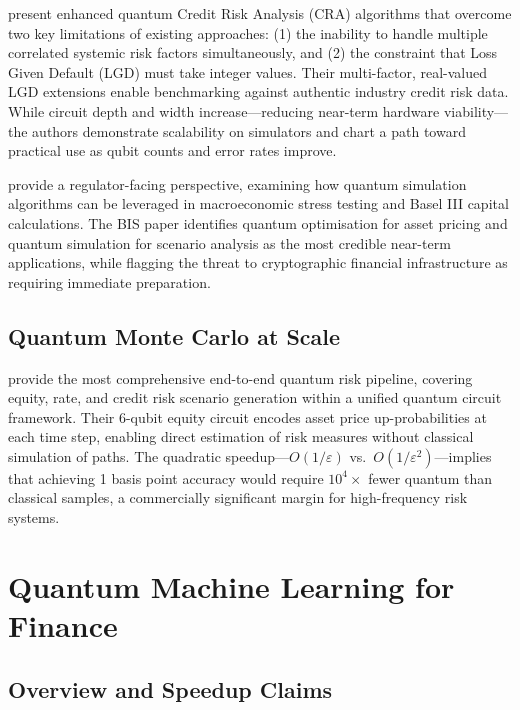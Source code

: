 \documentclass[12pt,a4paper]{article}
\begin{document}
\citet{dri_towards_2022} present enhanced quantum Credit Risk Analysis (CRA) algorithms that overcome two key limitations of existing approaches: (1) the inability to handle multiple correlated systemic risk factors simultaneously, and (2) the constraint that Loss Given Default (LGD) must take integer values. Their multi-factor, real-valued LGD extensions enable benchmarking against authentic industry credit risk data. While circuit depth and width increase---reducing near-term hardware viability---the authors demonstrate scalability on simulators and chart a path toward practical use as qubit counts and error rates improve.

\citet{auer_quantum_2024} provide a regulator-facing perspective, examining how quantum simulation algorithms can be leveraged in macroeconomic stress testing and Basel III capital calculations. The BIS paper identifies quantum optimisation for asset pricing and quantum simulation for scenario analysis as the most credible near-term applications, while flagging the threat to cryptographic financial infrastructure as requiring immediate preparation.

\subsection{Quantum Monte Carlo at Scale}

\citet{matsakos_quantum_2024} provide the most comprehensive end-to-end quantum risk pipeline, covering equity, rate, and credit risk scenario generation within a unified quantum circuit framework. Their 6-qubit equity circuit encodes asset price up-probabilities at each time step, enabling direct estimation of risk measures without classical simulation of paths. The quadratic speedup---$O(1/\varepsilon)$ vs.\ $O(1/\varepsilon^2)$---implies that achieving 1 basis point accuracy would require $10^4 \times$ fewer quantum than classical samples, a commercially significant margin for high-frequency risk systems.

\section{Quantum Machine Learning for Finance}
\label{sec:qml}

\subsection{Overview and Speedup Claims}
\end{document}
